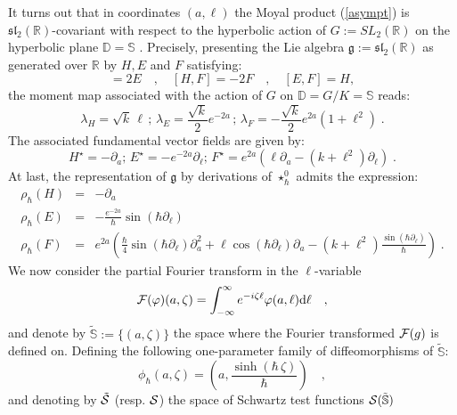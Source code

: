 \documentclass{article}
\newcommand{\DD}{\mathbb D}
\renewcommand{\SS}{\mathbb S}
\newcommand{\R}{\mathbb R}
\renewcommand{\gg}{\mathfrak g}
\def\cf{{\cal F}}
\def\cs{{\cal S}}
\def \R{{\mathbb R}}
\begin{document}
\vspace{2mm}

\noindent It turns out that in coordinates $(a,\ell)$ the Moyal product (\ref{asympt}) is $\mathfrak{sl}_2(\R)$-covariant
with respect to the hyperbolic action of $G:=SL_2(\R)$ on the hyperbolic plane $\DD=\SS$ \cite{Bithese}. Precisely, presenting the Lie algebra $\gg:=\mathfrak{sl}_2(\R)$ as generated over $\R$ by $H, E$ and $F$ satisfying:
\begin{equation}
 [H,E] = 2E \quad,\quad [H,F] = -2F \quad,\quad [E,F] = H,\label{HEF}
 \end{equation}
the moment map associated with the action of $G$ on $\DD=G/K=\SS$ reads:
\begin{equation}\label{moments}
\lambda_H=\sqrt{k}\,\ell\,;\,\lambda_E=\frac{\sqrt{k}}{2}e^{-2a}\,;\,\lambda_F=-\frac{\sqrt{k}}{2}e^{2a}(1+\ell^2)\;.
\end{equation}
The associated fundamental vector fields are given by:
\begin{equation}\label{fundamental}
 H^\star = -\partial_a; \, E^\star = -e^{-2a}\partial_\ell;  \,
 F^\star= e^{2a}(\ell \partial_a - (k+\ell^2) \partial_\ell)\;.
 \end{equation}
At last, the representation of $\gg$ by derivations of $\star^0_\hbar$ admits the expression:
\begin{eqnarray}
\rho_{\hbar } (H) &=& -\partial_a \\
\rho_{\hbar }(E) &=& -\frac{e^{-2a}}{ \hbar } \sin ( \hbar \partial_\ell) \\
\rho_{\hbar }(F) &=&
 e^{2a}\left(\frac{\hbar  }4\sin ( \hbar \partial_\ell)\partial_a^2+
  \ell\cos ( \hbar \partial_\ell)\partial_a-(k+\ell^2)\frac{\sin ( \hbar \partial_\ell)}\hbar
\right)\;.\label{lambdaF} 
\end{eqnarray}
We now consider the partial Fourier transform in the $\ell$-variable
\begin{equation}
{\cal F}(\varphi)(a,\zeta) = \int_{-\infty}^\infty e^{-i \zeta \ell} \varphi(a, \ell) {\rm d}\ell \quad,
\end{equation}
and denote by $\tilde{\SS}:=\{(a,\zeta)\}$ the space where the Fourier transformed $\cf(g)$ is defined on.
\noindent Defining the following one-parameter family of diffeomorphisms of $\tilde{\SS}$:
\begin{equation}
\phi_\hbar  (a,\zeta) = \left(a,\frac{\sinh (\hbar\, \zeta)}{\hbar}\right) \quad ,
\end{equation}
and denoting by $\tilde{\cs}$ (resp. $\cs$) the space of Schwartz test functions $\cs(\tilde{\SS})$
\end{document}
